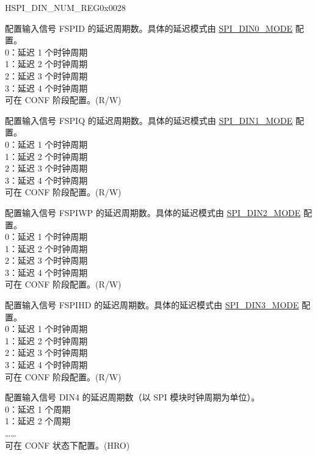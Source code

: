 \begin{register}{H}{SPI\_DIN\_NUM\_REG}{0x0028}\label{regdesc:SPIDINNUMREG}
%
%
%
%
%
%
%
%
%
\regnewline%
\begin{regdesc}\begin{reglist}
\label{fielddesc:SPIDIN0NUM}\item [SPI\_DIN0\_NUM] 配置输入信号 FSPID 的延迟周期数。具体的延迟模式由 \hyperref[fielddesc:SPIDIN0MODE]{SPI\_DIN0\_MODE} 配置。\\
0：延迟 1 个时钟周期\\
1：延迟 2 个时钟周期\\
2：延迟 3 个时钟周期\\
3：延迟 4 个时钟周期\\
可在 CONF 阶段配置。(R/W)
\label{fielddesc:SPIDIN1NUM}\item [SPI\_DIN1\_NUM] 配置输入信号 FSPIQ 的延迟周期数。具体的延迟模式由 \hyperref[fielddesc:SPIDIN1MODE]{SPI\_DIN1\_MODE} 配置。\\
0：延迟 1 个时钟周期\\
1：延迟 2 个时钟周期\\
2：延迟 3 个时钟周期\\
3：延迟 4 个时钟周期\\
可在 CONF 阶段配置。(R/W)
\label{fielddesc:SPIDIN2NUM}\item [SPI\_DIN2\_NUM] 配置输入信号 FSPIWP 的延迟周期数。具体的延迟模式由 \hyperref[fielddesc:SPIDIN2MODE]{SPI\_DIN2\_MODE} 配置。\\
0：延迟 1 个时钟周期\\
1：延迟 2 个时钟周期\\
2：延迟 3 个时钟周期\\
3：延迟 4 个时钟周期\\
可在 CONF 阶段配置。(R/W)
\label{fielddesc:SPIDIN3NUM}\item [SPI\_DIN3\_NUM] 配置输入信号 FSPIHD 的延迟周期数。具体的延迟模式由 \hyperref[fielddesc:SPIDIN3MODE]{SPI\_DIN3\_MODE} 配置。\\
0：延迟 1 个时钟周期\\
1：延迟 2 个时钟周期\\
2：延迟 3 个时钟周期\\
3：延迟 4 个时钟周期\\
可在 CONF 阶段配置。(R/W)
\label{fielddesc:SPIDIN4NUM}\item [SPI\_DIN4\_NUM] 配置输入信号 DIN4 的延迟周期数（以 SPI 模块时钟周期为单位）。\\
0：延迟 1 个周期\\
1：延迟 2 个周期\\
……\\
可在 CONF 状态下配置。(HRO)


\end{reglist}
\end{regdesc}
\end{register}

